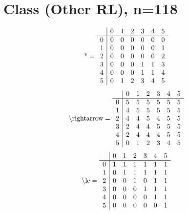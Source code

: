 \documentclass[11pt]{article}
\begin{document}
\section{Class (Other RL), n=118}
\[\text{*} = 
\begin{array}{r | r r r r r r}
 & 0 & 1 & 2 & 3 & 4 & 5 \\ \hline
0 & 0 & 0 & 0 & 0 & 0 & 0 \\
1 & 0 & 0 & 0 & 0 & 0 & 1 \\
2 & 0 & 0 & 0 & 0 & 0 & 2 \\
3 & 0 & 0 & 0 & 1 & 1 & 3 \\
4 & 0 & 0 & 0 & 1 & 1 & 4 \\
5 & 0 & 1 & 2 & 3 & 4 & 5 \\
\end{array}
\]
\[\text{\textbackslash rightarrow} = 
\begin{array}{r | r r r r r r}
 & 0 & 1 & 2 & 3 & 4 & 5 \\ \hline
0 & 5 & 5 & 5 & 5 & 5 & 5 \\
1 & 4 & 5 & 5 & 5 & 5 & 5 \\
2 & 4 & 4 & 5 & 4 & 5 & 5 \\
3 & 2 & 4 & 4 & 5 & 5 & 5 \\
4 & 2 & 4 & 4 & 4 & 5 & 5 \\
5 & 0 & 1 & 2 & 3 & 4 & 5 \\
\end{array}
\]
\[\text{\textbackslash le} = 
\begin{array}{r | r r r r r r}
 & 0 & 1 & 2 & 3 & 4 & 5 \\ \hline
0 & 1 & 1 & 1 & 1 & 1 & 1 \\
1 & 0 & 1 & 1 & 1 & 1 & 1 \\
2 & 0 & 0 & 1 & 0 & 1 & 1 \\
3 & 0 & 0 & 0 & 1 & 1 & 1 \\
4 & 0 & 0 & 0 & 0 & 1 & 1 \\
5 & 0 & 0 & 0 & 0 & 0 & 1 \\
\end{array}
\]
\end{document}
